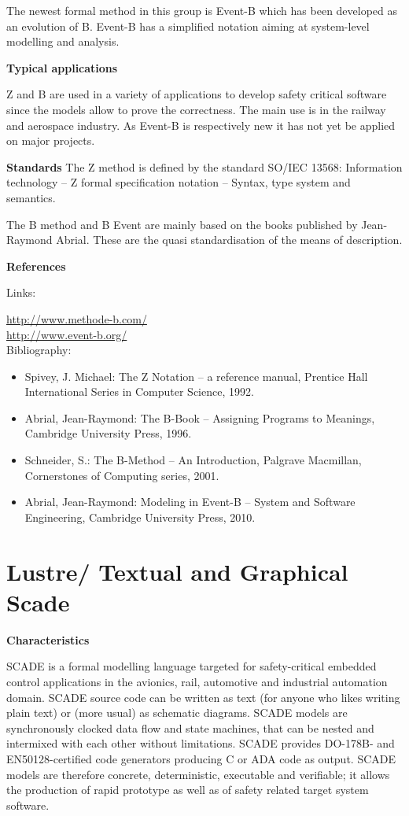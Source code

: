 \documentclass{./template/openetcs_report}
\begin{document}
 The newest formal method in this group is Event-B which has been developed as an evolution of B. Event-B has a simplified notation aiming at system-level modelling and analysis. 

	\textbf{Typical applications}

Z and B are used in a variety of applications to develop safety critical software since the models allow to prove the correctness. The main use is in the railway and aerospace industry. As Event-B is respectively new it has not yet be applied on major projects.

	\textbf{Standards}
The Z method is defined by the standard SO/IEC 13568: Information technology -- Z formal specification notation -- Syntax, type system and semantics.

The B method and B Event are mainly based on the books published by Jean-Raymond Abrial. These  are the quasi standardisation of the means of description. 

	\textbf{References}

Links:

\url{http://www.methode-b.com/}\\[4pt]
\url{http://www.event-b.org/}\\[4pt]

Bibliography:

\begin{itemize}
\item Spivey, J. Michael: The Z Notation -- a reference manual, Prentice Hall International Series in Computer Science, 1992.
\item  Abrial, Jean-Raymond: The B-Book -- Assigning Programs to Meanings, Cambridge University Press, 1996.
\item  Schneider, S.: The B-Method -- An Introduction, Palgrave Macmillan, Cornerstones of Computing series, 2001.
\item Abrial, Jean-Raymond: Modeling in Event-B -- System and Software Engineering,  Cambridge University Press, 2010.
\end{itemize}
 
\section{Lustre/ Textual and Graphical Scade}

	\textbf{Characteristics}

SCADE is a formal modelling language targeted for safety-critical embedded control applications in the avionics, rail, automotive and industrial automation domain. SCADE source code can be written as text (for anyone who likes writing plain text) or (more usual) as schematic diagrams. SCADE models are synchronously clocked data flow and state machines, that can be nested and intermixed with each other without limitations. 
SCADE provides DO-178B- and EN50128-certified code generators producing C or ADA code as output. SCADE models are therefore concrete, deterministic, executable and verifiable; it allows the production of rapid prototype as well as of safety related target system software. 
\end{document}
